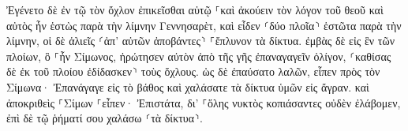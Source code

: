 \documentclass{openreader}
\begin{document}
Ἐγένετο δὲ ἐν τῷ τὸν ὄχλον ἐπικεῖσθαι αὐτῷ ⸀καὶ ἀκούειν τὸν λόγον τοῦ θεοῦ καὶ αὐτὸς ἦν ἑστὼς παρὰ τὴν λίμνην Γεννησαρὲτ, 
καὶ εἶδεν ⸂δύο πλοῖα⸃ ἑστῶτα παρὰ τὴν λίμνην, οἱ δὲ ἁλιεῖς ⸂ἀπ’ αὐτῶν ἀποβάντες⸃ ⸀ἔπλυνον τὰ δίκτυα. 
ἐμβὰς δὲ εἰς ἓν τῶν πλοίων, ὃ ⸀ἦν Σίμωνος, ἠρώτησεν αὐτὸν ἀπὸ τῆς γῆς ἐπαναγαγεῖν ὀλίγον, ⸂καθίσας δὲ ἐκ τοῦ πλοίου ἐδίδασκεν⸃ τοὺς ὄχλους. 
ὡς δὲ ἐπαύσατο λαλῶν, εἶπεν πρὸς τὸν Σίμωνα· Ἐπανάγαγε εἰς τὸ βάθος καὶ χαλάσατε τὰ δίκτυα ὑμῶν εἰς ἄγραν. 
καὶ ἀποκριθεὶς ⸀Σίμων ⸀εἶπεν· Ἐπιστάτα, δι’ ⸀ὅλης νυκτὸς κοπιάσαντες οὐδὲν ἐλάβομεν, ἐπὶ δὲ τῷ ῥήματί σου χαλάσω ⸂τὰ δίκτυα⸃. 
\end{document}
